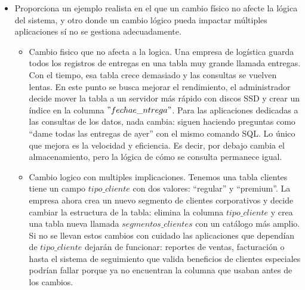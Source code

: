 \documentclass[12pt]{report}
\begin{document}
\begin{enumerate}[label=\textbf{\arabic*.}, leftmargin=*]
\begin{enumerate}[label=\textbf{\alph*.}, leftmargin=*, itemsep=1.0em]
\begin{itemize}
  
  \item Proporciona un ejemplo realista en el que un cambio f\'isico no afecte la l\'ogica del sistema, y otro donde un cambio l\'ogico pueda impactar m\'ultiples aplicaciones s\'i no se gestiona adecuadamente.\\


         \begin{itemize}
         
             \item Cambio fisico que no afecta a la logica.
               Una empresa de logística guarda todos los registros de entregas en una tabla muy grande llamada entregas. Con el tiempo, esa tabla crece demasiado y las consultas se vuelven lentas. En este punto se busca mejorar el rendimiento, el administrador decide mover la tabla a un servidor más rápido con discos SSD y crear un índice en la columna $"fechae\_ntrega"$.
                Para las aplicaciones dedicadas a las consultas de los datos, nada cambia: siguen haciendo preguntas como “dame todas las entregas de ayer” con el mismo comando SQL. Lo único que mejora es la velocidad y eficiencia. Es decir, por debajo cambia el almacenamiento, pero la lógica de cómo se consulta permanece igual.
                
             \item Cambio logico con multiples implicaciones.
                Tenemos una tabla clientes tiene un campo $tipo\_cliente$ con dos valores: “regular” y “premium”. La empresa ahora crea un nuevo segmento de clientes corporativos y decide cambiar la estructura de la tabla: elimina la columna $tipo\_cliente$ y crea una tabla nueva llamada $segmentos\_clientes$ con un catálogo más amplio.
                  Si no se llevan estos cambios con cuidado las aplicaciones que dependían de $tipo\_cliente$ dejarán de funcionar: reportes de ventas, facturación o hasta el sistema de seguimiento que valida beneficios de clientes especiales podrían fallar porque ya no encuentran la columna que usaban antes de los cambios.
         \end{itemize}

\end{itemize}





\end{enumerate}
\end{enumerate}
\end{document}
